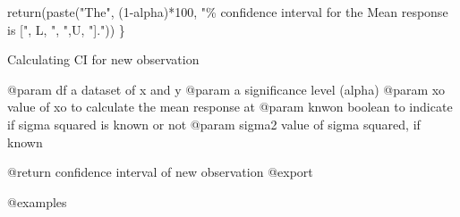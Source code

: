 \documentclass[
]{article}
\newenvironment{Shaded}{\begin{snugshade}}{\end{snugshade}}
\newcommand{\DecValTok}[1]{\textcolor[rgb]{0.00,0.00,0.81}{#1}}
\newcommand{\FunctionTok}[1]{\textcolor[rgb]{0.00,0.00,0.00}{#1}}
\newcommand{\NormalTok}[1]{#1}
\newcommand{\SpecialCharTok}[1]{\textcolor[rgb]{0.00,0.00,0.00}{#1}}
\newcommand{\StringTok}[1]{\textcolor[rgb]{0.31,0.60,0.02}{#1}}
\begin{document}
\begin{Shaded}
\begin{Highlighting}[]
  \FunctionTok{return}\NormalTok{(}\FunctionTok{paste}\NormalTok{(}\StringTok{"The"}\NormalTok{, (}\DecValTok{1}\SpecialCharTok{{-}}\NormalTok{alpha)}\SpecialCharTok{*}\DecValTok{100}\NormalTok{, }\StringTok{"\% confidence interval for the Mean response is ["}\NormalTok{, L, }\StringTok{", "}\NormalTok{,U, }\StringTok{"]."}\NormalTok{))}
\NormalTok{\}}
\end{Highlighting}
\end{Shaded}

Calculating CI for new observation

@param df a dataset of x and y @param a significance level (alpha)
@param xo value of xo to calculate the mean response at @param knwon
boolean to indicate if sigma squared is known or not @param sigma2 value
of sigma squared, if known

@return confidence interval of new observation @export

@examples
\end{document}

